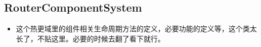 \documentclass[9pt, b5paper]{article}
\begin{document}
\subsection{RouterComponentSystem}
\label{sec-7-22}
\begin{itemize}
\item 这个热更域里的组件相关生命周期方法的定义，必要功能的定义等，这个类太长了，不贴这里。必要的时候去翻了看下就行。
\end{itemize}
\end{document}
